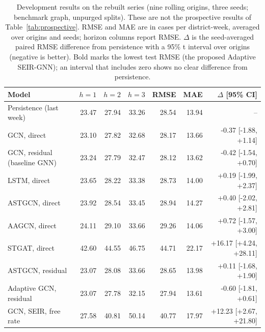 \begin{table}[t]
\centering
\caption{Development results on the rebuilt series (nine rolling origins, three seeds; benchmark graph, unpurged splits). These are not the prospective results of Table~\ref{tab:prospective}. RMSE and MAE are in cases per district-week, averaged over origins and seeds; horizon columns report RMSE. $\Delta$ is the seed-averaged paired RMSE difference from persistence with a 95\% t interval over origins (negative is better). Bold marks the lowest test RMSE (the proposed Adaptive SEIR-GNN); an interval that includes zero shows no clear difference from persistence.}
\label{tab:main}
\small\setlength{\tabcolsep}{3pt}
\begin{tabular}{@{}p{2.85in}rrrrrr@{}}
\toprule
Model & $h=1$ & $h=2$ & $h=3$ & RMSE & MAE & $\Delta$ [95\% CI] \\
\midrule
Persistence (last week) & 23.47 & 27.94 & 33.26 & 28.54 & 13.94 & -- \\ %

GCN, direct & 23.10 & 27.82 & 32.68 & 28.17 & 13.66 & -0.37 [-1.88, +1.14] \\ %

GCN, residual (baseline GNN) & 23.24 & 27.79 & 32.47 & 28.12 & 13.62 & -0.42 [-1.54, +0.70] \\ %

LSTM, direct & 23.65 & 28.22 & 33.38 & 28.73 & 14.00 & +0.19 [-1.99, +2.37] \\ %

ASTGCN, direct & 23.92 & 28.54 & 33.45 & 28.94 & 14.27 & +0.40 [-2.02, +2.81] \\ %

AAGCN, direct & 24.11 & 29.10 & 33.66 & 29.26 & 14.06 & +0.72 [-1.57, +3.00] \\ %

STGAT, direct & 42.60 & 44.55 & 46.75 & 44.71 & 22.17 & +16.17 [+4.24, +28.11] \\ %

ASTGCN, residual & 23.07 & 28.08 & 33.66 & 28.65 & 13.98 & +0.11 [-1.68, +1.90] \\ %

Adaptive GCN, residual & 23.07 & 27.78 & 32.15 & 27.94 & 13.61 & -0.60 [-1.81, +0.61] \\ %

GCN, SEIR, free rate & 27.58 & 40.81 & 50.14 & 40.77 & 17.97 & +12.23 [+2.67, +21.80] \\ %


\end{tabular}
\end{table}
